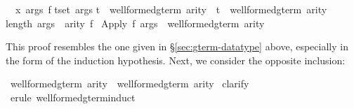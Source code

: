 \begin{isabellebody}
\begin{isamarkuptxt}
\begin{isabelle}%
\ {}{}\ {}x\ args\ f{}\isanewline
{}t{}set\ args{}\isanewline
{}t\ {}\ well{}formed{}gterm\ arity\ {}\ t\ {}\ well{}formed{}gterm{}\ arity{}\isanewline
{}length\ args\ {}\ arity\ f{}\isanewline
{}\ Apply\ f\ args\ {}\ well{}formed{}gterm{}\ arity%
\end{isabelle}
This proof resembles the one given in
{\S}\ref{sec:gterm-datatype} above, especially in the form of the
induction hypothesis.  Next, we consider the opposite inclusion:%
\end{isamarkuptxt}%
\isamarkuptrue%
%
\endisatagproof
{\isafoldproof}%
%
\isadelimproof
%
\endisadelimproof
{}\isamarkupfalse%
\ {}well{}formed{}gterm{}\ arity\ {}\ well{}formed{}gterm\ arity{}\isanewline
%
\isadelimproof
%
\endisadelimproof
%
\isatagproof
{}\isamarkupfalse%
\ clarify\isanewline
{}\isamarkupfalse%
\ {}erule\ well{}formed{}gterm{}{}induct{}\isanewline

\end{isabellebody}
